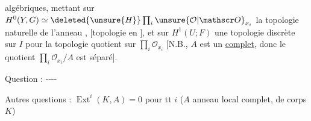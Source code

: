 algébriques,  mettant sur $H^0(Y,G)\simeq\deleted{\unsure{H}}\prod_i\unsure{\mathcal O|\mathscr O}_{x_i}$ la topologie
 naturelle de l'anneau ,
[topologie  en ], et sur $H^1(U;F)$ une
topologie    discrète  sur $I$ pour la
topologie quotient sur $\prod_i\mathcal O_{x_i}$ [N.B., $A$ est un
 \uline{complet}, donc le quotient $\prod_i\mathcal O_{x_i}/A$
est séparé].

Question :  \mbox{-{}-{}-{}-}

Autres questions : $\operatorname{Ext}^i(K,A)=0$ pour tt $i$ ($A$ anneau local
  complet, de corps $K$)

